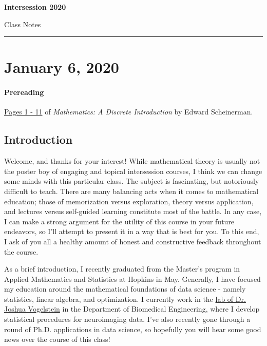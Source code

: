 \documentclass[11pt]{article}
\theoremstyle{plain}
\theoremstyle{definition}
\theoremstyle{remark}
\begin{document}

 \hfill {\bf Intersession 2020}

 \hfill 
{Class Notes}

\noindent \rule[0.1in]{\textwidth}{0.4pt}


\section{January 6, 2020}

\paragraph{Prereading} \href{https://drive.google.com/drive/folders/1T_M-dvYE4leOSmpKt2eGYOvPRch_SDpK?usp=sharing}{Pages 1 - 11} of {\it Mathematics: A Discrete Introduction} by Edward Scheinerman.

\subsection{Introduction}
Welcome, and thanks for your interest! While mathematical theory is usually not the poster boy of engaging and topical intersession courses, I think we can change some minds with this particular class. The subject is fascinating, but notoriously difficult to teach. There are many balancing acts when it comes to mathematical education; those of memorization versus exploration, theory versus application, and lectures versus self-guided learning constitute most of the battle. In any case, I can make a strong argument for the utility of this course in your future endeavors, so I'll attempt to present it in a way that is best for you. To this end, I ask of you all a healthy amount of honest and constructive feedback throughout the course.

As a brief introduction, I recently graduated from the Master's program in Applied Mathematics and Statistics at Hopkins in May. Generally, I have focused my education around the mathematical foundations of data science - namely statistics, linear algebra, and optimization. I currently work in the \href{https://neurodata.io/}{lab of Dr. Joshua Vogelstein} in the Department of Biomedical Engineering, where I develop statistical procedures for neuroimaging data. I've also recently gone through a round of Ph.D. applications in data science, so hopefully you will hear some good news over the course of this class!
\end{document}
